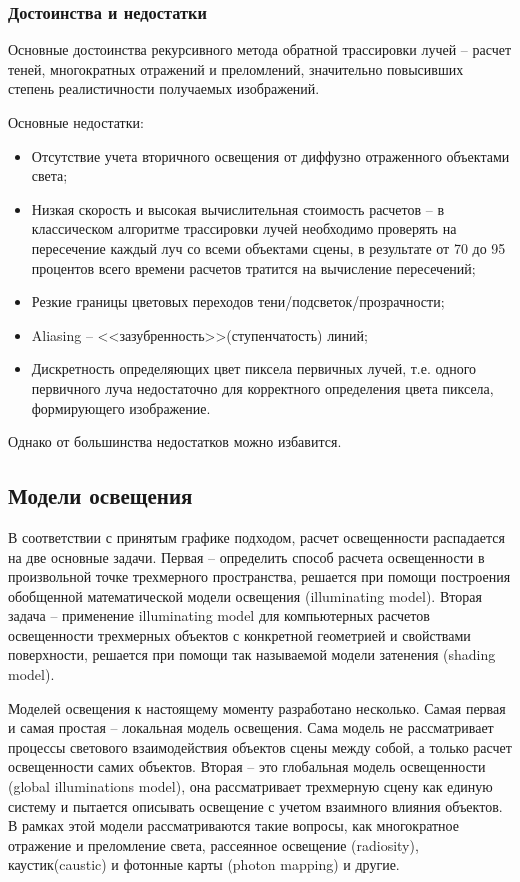 \documentclass[12pt, a4paper, utf8]{article}
\begin{document}
\subsubsection{Достоинства и недостатки}

Основные достоинства рекурсивного метода обратной трассировки лучей – расчет теней, многократных отражений и преломлений, значительно повысивших степень реалистичности получаемых изображений.

Основные недостатки:
\begin{itemize}
\item Отсутствие учета вторичного освещения от диффузно отраженного объектами света;
\item Низкая скорость и высокая вычислительная стоимость расчетов -- в классическом алгоритме трассировки лучей необходимо проверять на пересечение каждый луч со всеми объектами сцены, в результате от 70 до 95 процентов всего времени расчетов тратится на вычисление пересечений;
\item Резкие границы цветовых переходов тени/подсветок/прозрачности;
\item Aliasing – <<зазубренность>>(ступенчатость) линий;
\item Дискретность определяющих цвет пиксела первичных лучей, т.е. одного первичного луча недостаточно для корректного определения цвета пиксела, формирующего изображение.
\end{itemize}

Однако от большинства недостатков можно избавится.

\subsection{Модели освещения}

В соответствии с принятым графике подходом, расчет освещенности распадается на две основные задачи. Первая -- определить способ расчета освещенности в произвольной точке трехмерного пространства, решается при помощи построения обобщенной математической модели освещения (illuminating model). Вторая задача -- применение illuminating model для компьютерных расчетов освещенности трехмерных объектов с конкретной геометрией и свойствами поверхности, решается при помощи так называемой модели затенения (shading model).

Моделей освещения к настоящему моменту разработано несколько. Самая первая и самая простая -- локальная модель освещения. Сама модель не рассматривает процессы светового взаимодействия объектов сцены между собой, а только расчет освещенности самих объектов. Вторая -- это глобальная модель освещенности (global illuminations model), она рассматривает трехмерную сцену как единую систему и пытается описывать освещение с учетом взаимного влияния объектов. В рамках этой модели рассматриваются такие вопросы, как многократное отражение и преломление света, рассеянное освещение (radiosity), каустик(caustic) и фотонные карты (photon mapping) и другие.
\end{document}
